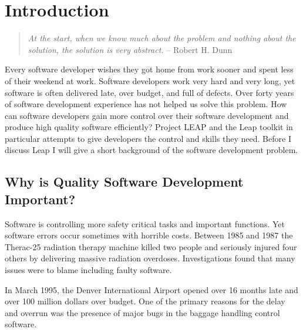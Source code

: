 
\chapter{Introduction}
\label{sec:intro}
\begin{quote}
{\em At the start, when we know much about the problem and nothing about the
solution, the solution is very abstract.} -- Robert H. Dunn
\end{quote}

Every software developer wishes they got home from work sooner and spent less
of their weekend at work. Software developers work very hard and very long, yet
software is often delivered late, over budget, and full of defects.  Over forty
years of software development experience has not helped us solve this problem.
How can software developers gain more control over their software development
and produce high quality software efficiently?  Project LEAP and the Leap
toolkit in particular attempts to give developers the control and skills they
need.  Before I discuss Leap I will give a short background of the software
development problem.

\section{Why is Quality Software Development Important?}



Software is controlling more safety critical tasks and important
functions\cite{Armour93}. Yet software errors occur sometimes with horrible
costs. Between 1985 and 1987 the Therac-25 radiation therapy machine killed two
people and seriously injured four others by delivering massive radiation
overdoses.  Investigations found that many issues were to blame including
faulty software\cite{Leveson93}.

In March 1995, the Denver International Airport opened over 16 months late and
over 100 million dollars over budget. One of the primary reasons for the delay
and overrun was the presence of major bugs in the baggage handling control
software\cite{Glass98}.

